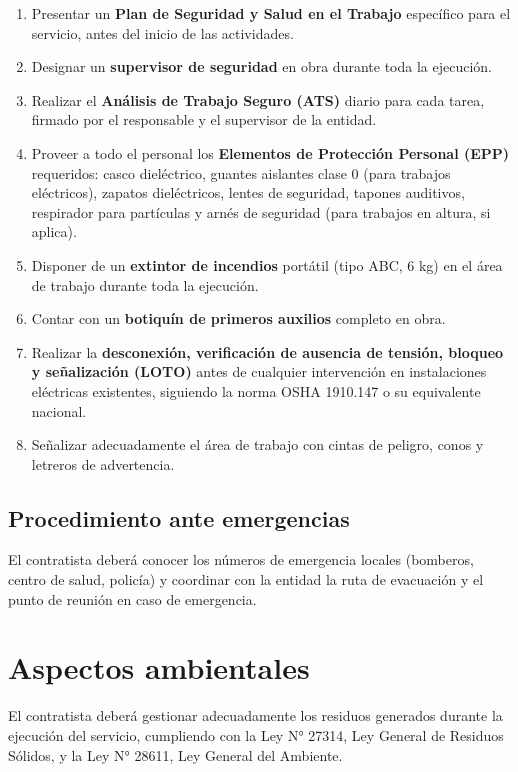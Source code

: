 \documentclass[12pt,a4paper]{article}
\begin{document}
\begin{enumerate}
  \item Presentar un \textbf{Plan de Seguridad y Salud en el Trabajo} específico para el servicio, antes del inicio de las actividades.
  \item Designar un \textbf{supervisor de seguridad} en obra durante toda la ejecución.
  \item Realizar el \textbf{Análisis de Trabajo Seguro (ATS)} diario para cada tarea, firmado por el responsable y el supervisor de la entidad.
  \item Proveer a todo el personal los \textbf{Elementos de Protección Personal (EPP)} requeridos: casco dieléctrico, guantes aislantes clase 0 (para trabajos eléctricos), zapatos dieléctricos, lentes de seguridad, tapones auditivos, respirador para partículas y arnés de seguridad (para trabajos en altura, si aplica).
  \item Disponer de un \textbf{extintor de incendios} portátil (tipo ABC, 6 kg) en el área de trabajo durante toda la ejecución.
  \item Contar con un \textbf{botiquín de primeros auxilios} completo en obra.
  \item Realizar la \textbf{desconexión, verificación de ausencia de tensión, bloqueo y señalización (LOTO)} antes de cualquier intervención en instalaciones eléctricas existentes, siguiendo la norma OSHA 1910.147 o su equivalente nacional.
  \item Señalizar adecuadamente el área de trabajo con cintas de peligro, conos y letreros de advertencia.
\end{enumerate}

\subsection{Procedimiento ante emergencias}

El contratista deberá conocer los números de emergencia locales (bomberos, centro de salud, policía) y coordinar con la entidad la ruta de evacuación y el punto de reunión en caso de emergencia.

\section{Aspectos ambientales}

El contratista deberá gestionar adecuadamente los residuos generados durante la ejecución del servicio, cumpliendo con la Ley N° 27314, Ley General de Residuos Sólidos, y la Ley N° 28611, Ley General del Ambiente.
\end{document}
